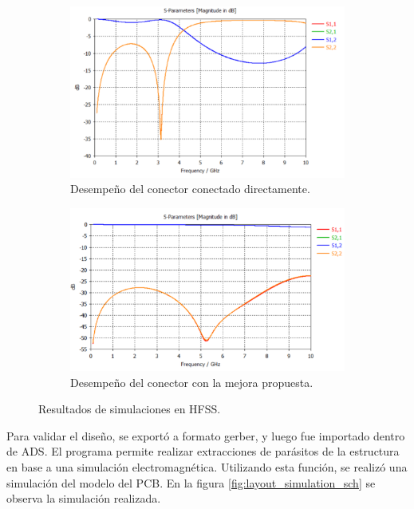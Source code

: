 \begin{figure}
    \centering

    \begin{subfigure}[b]{0.45\textwidth}
        \includegraphics[width=\textwidth]{images/sma_simulation_result.png}
        \caption{Desempeño del conector conectado directamente.}
        \label{fig:sma_simulation_result}
    \end{subfigure}
    \hfill
    \begin{subfigure}[b]{0.45\textwidth}
        \includegraphics[width=\textwidth]{images/sma_improvement_result.png}
        \caption{Desempeño del conector con la mejora propuesta.}
        \label{fig:sma_improvement_result}
    \end{subfigure}

    \caption{Resultados de simulaciones en HFSS.}
    \label{fig:sma_simulations_results}
\end{figure}

Para validar el diseño, se exportó a formato gerber, y luego fue importado
dentro de ADS. El programa permite realizar extracciones de parásitos de la
estructura en base a una simulación electromagnética. Utilizando esta función,
se realizó una simulación del modelo del PCB. En la figura
\ref{fig:layout_simulation_sch} se observa la simulación realizada.

